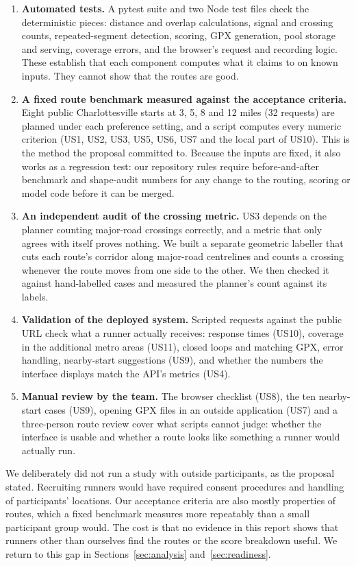 \begin{enumerate}
\item \textbf{Automated tests.} A pytest suite and two Node test files check
  the deterministic pieces: distance and overlap calculations, signal and
  crossing counts, repeated-segment detection, scoring, GPX generation, pool
  storage and serving, coverage errors, and the browser's request and
  recording logic. These establish that each component computes what it
  claims to on known inputs. They cannot show that the routes are good.
\item \textbf{A fixed route benchmark measured against the acceptance
  criteria.} Eight public Charlottesville starts at 3, 5, 8 and 12 miles
  (32 requests) are planned under each preference setting, and a script
  computes every numeric criterion (US1, US2, US3, US5, US6, US7 and the local
  part of US10). This is the method the proposal committed to. Because the
  inputs are fixed, it also works as a regression test: our repository rules
  require before-and-after benchmark and shape-audit numbers for any change
  to the routing, scoring or model code before it can be merged.
\item \textbf{An independent audit of the crossing metric.} US3 depends on
  the planner counting major-road crossings correctly, and a metric that only
  agrees with itself proves nothing. We built a separate geometric labeller
  that cuts each route's corridor along major-road centrelines and counts a
  crossing whenever the route moves from one side to the other. We then
  checked it against hand-labelled cases and measured the planner's count
  against its labels.
\item \textbf{Validation of the deployed system.} Scripted requests against
  the public URL check what a runner actually receives: response times
  (US10), coverage in the additional metro areas (US11), closed loops and
  matching GPX, error handling, nearby-start suggestions (US9), and whether
  the numbers the interface displays match the API's metrics (US4).
\item \textbf{Manual review by the team.} The browser checklist (US8), the
  ten nearby-start cases (US9), opening GPX files in an outside application
  (US7) and a three-person route review cover what scripts cannot judge:
  whether the interface is usable and whether a route looks like something a
  runner would actually run.
\end{enumerate}

We deliberately did not run a study with outside participants, as the
proposal stated. Recruiting runners would have required consent procedures
and handling of participants' locations. Our acceptance criteria are also
mostly properties of routes, which a fixed benchmark measures more
repeatably than a small participant group would. The cost is that no
evidence in this report shows that runners other than ourselves find the
routes or the score breakdown useful. We return to this gap in
Sections~\ref{sec:analysis} and~\ref{sec:readiness}.


